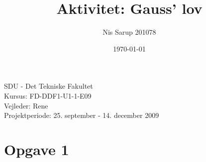 \documentclass[a4paper,10pt]{article}
\begin{document}
\title{Aktivitet: Gauss’ lov}
\author{Nis Sarup 201078}
\date{\today}
\maketitle
\begin{center}
	SDU - Det Tekniske Fakultet\\
	Kursus: FD-DDF1-U1-1-E09\\
	Vejleder: Rene \\
	Projektperiode: 25. september - 14. december 2009\\
\end{center}
\newpage

\section{Opgave 1} %
\label{sec:opgave_1}

\end{document}
